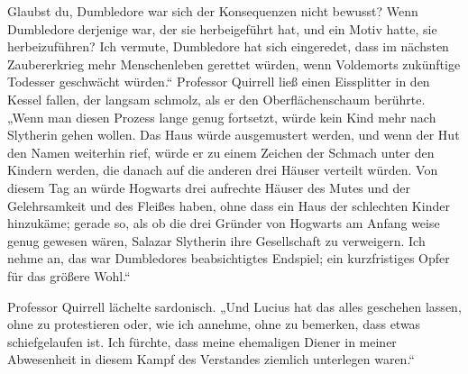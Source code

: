 Glaubst du, Dumbledore war sich der Konsequenzen nicht bewusst? Wenn Dumbledore derjenige war, der sie herbeigeführt hat, und ein Motiv hatte, sie herbeizuführen? Ich vermute, Dumbledore hat sich eingeredet, dass im nächsten Zaubererkrieg mehr Menschenleben gerettet würden, wenn Voldemorts zukünftige Todesser geschwächt würden.“
Professor Quirrell ließ einen Eissplitter in den Kessel fallen, der langsam schmolz, als er den Oberflächenschaum berührte.
„Wenn man diesen Prozess lange genug fortsetzt, würde kein Kind mehr nach Slytherin gehen wollen. Das Haus würde ausgemustert werden, und wenn der Hut den Namen weiterhin rief, würde er zu einem Zeichen der Schmach unter den Kindern werden, die danach auf die anderen drei Häuser verteilt würden. Von diesem Tag an würde Hogwarts drei aufrechte Häuser des Mutes und der Gelehrsamkeit und des Fleißes haben, ohne dass ein Haus der schlechten Kinder hinzukäme; gerade so, als ob die drei Gründer von Hogwarts am Anfang weise genug gewesen wären, Salazar Slytherin ihre Gesellschaft zu verweigern. Ich nehme an, das war Dumbledores beabsichtigtes Endspiel; ein kurzfristiges Opfer für das größere Wohl.“

Professor Quirrell lächelte sardonisch.
„Und Lucius hat das alles geschehen lassen, ohne zu protestieren oder, wie ich annehme, ohne zu bemerken, dass etwas schiefgelaufen ist. Ich fürchte, dass meine ehemaligen Diener in meiner Abwesenheit in diesem Kampf des Verstandes ziemlich unterlegen waren.“


